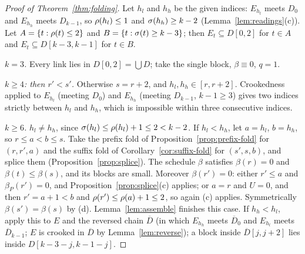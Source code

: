 \begin{proof}[Proof of Theorem~\ref{thm:folding}]
Let $h_l$ and $h_h$ be the given indices: $E_{h_l}$ meets $D_0$ and $E_{h_h}$ meets $D_{k-1}$, so $\rho(h_l)\le1$ and $\sigma(h_h)\ge k-2$
(Lemma~\ref{lem:readings}(c)). Let $A=\left\{ t:\rho(t)\le2 \right\}$ and $B=\left\{ t:\sigma(t)\ge k-3 \right\}$; then $E_t\subseteq D[0,2]$ for $t\in A$ and
$E_t\subseteq D[k-3,k-1]$ for $t\in B$.

\emph{$k=3$.} Every link lies in $D[0,2]=\bigcup D$; take the single block, $\beta\equiv0$, $q=1$.

\emph{$k\ge4$: then $r'<s'$.} Otherwise $s=r+2$, and $h_l,h_h\in[r,r+2]$. Crookedness applied to $E_{h_l}$ (meeting $D_0$) and $E_{h_h}$ (meeting
$D_{k-1}$, $k-1\ge3$) gives two indices strictly between $h_l$ and $h_h$, which is impossible within three consecutive indices.

\emph{$k\ge6$.} $h_l\ne h_h$, since $\sigma(h_l)\le\rho(h_l)+1\le2<k-2$. If $h_l<h_h$, let $a=h_l$, $b=h_h$, so $r\le a<b\le s$. Take the prefix
fold of Proposition~\ref{prop:prefix-fold} for $(r,r',a)$ and the suffix fold of Corollary~\ref{cor:suffix-fold} for $(s',s,b)$, and splice
them (Proposition~\ref{prop:splice}). The schedule $\beta$ satisfies $\beta(r)=0$ and $\beta(t)\le\beta(s)$, and its blocks are small.
Moreover $\beta(r')=0$: either $r'\le a$ and $\beta_P(r')=0$, and Proposition~\ref{prop:splice}(c) applies; or $a=r$ and $U=0$, and then
$r'=a+1<b$ and $\rho(r')\le\rho(a)+1\le2$, so again (c) applies. Symmetrically $\beta(s')=\beta(s)$ by (d). Lemma~\ref{lem:assemble} finishes
this case. If $h_h<h_l$, apply this to $E$ and the reversed chain $\overline D$ (in which $E_{h_h}$ meets $\overline D_0$ and $E_{h_l}$ meets
$\overline D_{k-1}$; $E$ is crooked in $\overline D$ by Lemma~\ref{lem:reverse}); a block inside $\overline D[j,j+2]$ lies inside
$D[k-3-j,k-1-j]$.


\end{proof}
